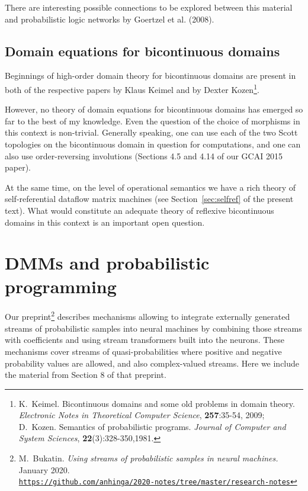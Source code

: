 \documentclass{article}
\begin{document}
There are interesting possible connections to be explored between this material and probabilistic logic networks by Goertzel et al. (2008).

\subsection{Domain equations for bicontinuous domains}

Beginnings of high-order domain theory for bicontinuous domains are present in both of the respective papers by Klaus Keimel and by Dexter Kozen\footnote{K.~Keimel. Bicontinuous domains and some old problems in domain theory. {\em Electronic Notes in Theoretical Computer Science}, {\bf 257}:35-54, 2009; D.~Kozen. Semantics of probabilistic programs. {\em Journal of Computer and System Sciences}, {\bf 22}(3):328-350,1981.}.

However, no theory of domain equations for bicontinuous domains has emerged so far to the best of my knowledge.
Even the question of the choice of morphisms in this context is non-trivial. Generally speaking, one can use each of the two Scott topologies
on the bicontinuous domain in question for computations, and one can also use order-reversing involutions (Sections 4.5 and 4.14 of our GCAI 2015 paper).

At the same time, on the level of operational semantics we have a rich theory of self-referential dataflow
matrix machines (see Section~\ref{sec:selfref} of the present text). What would constitute an adequate theory of reflexive bicontinuous domains in this context is an important open question.

\section{DMMs and probabilistic programming}

Our preprint\footnote{M.~Bukatin. {\em Using streams of probabilistic samples in neural machines.} January 2020.\\
\href{https://github.com/anhinga/2020-notes/tree/master/research-notes}{\tt https://github.com/anhinga/2020-notes/tree/master/research-notes}} describes mechanisms allowing to integrate externally generated streams of
probabilistic samples into neural machines by
combining those streams with coefficients and using stream transformers built into the neurons.
These mechanisms cover streams of quasi-probabilities where positive and negative probability values are allowed,
and also complex-valued streams. Here we include the material from Section 8 of that preprint.
\end{document}
